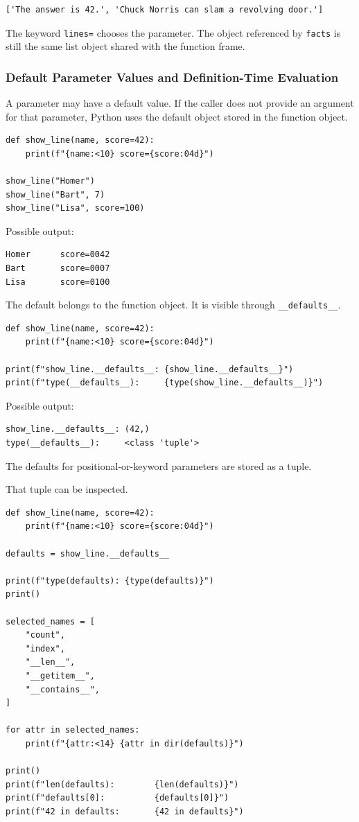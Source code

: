 \begin{verbatim}
['The answer is 42.', 'Chuck Norris can slam a revolving door.']
\end{verbatim}

The keyword \texttt{lines=} chooses the parameter. The object referenced by \texttt{facts} is still the same list object shared with the function frame.

\subsubsection{Default Parameter Values and Definition-Time Evaluation}

A parameter may have a default value. If the caller does not provide an argument for that parameter, Python uses the default object stored in the function object.

\begin{verbatim}
def show_line(name, score=42):
    print(f"{name:<10} score={score:04d}")

show_line("Homer")
show_line("Bart", 7)
show_line("Lisa", score=100)
\end{verbatim}

Possible output:

\begin{verbatim}
Homer      score=0042
Bart       score=0007
Lisa       score=0100
\end{verbatim}

The default belongs to the function object. It is visible through \texttt{\_\_defaults\_\_}.

\begin{verbatim}
def show_line(name, score=42):
    print(f"{name:<10} score={score:04d}")

print(f"show_line.__defaults__: {show_line.__defaults__}")
print(f"type(__defaults__):     {type(show_line.__defaults__)}")
\end{verbatim}

Possible output:

\begin{verbatim}
show_line.__defaults__: (42,)
type(__defaults__):     <class 'tuple'>
\end{verbatim}

The defaults for positional-or-keyword parameters are stored as a tuple.

That tuple can be inspected.

\begin{verbatim}
def show_line(name, score=42):
    print(f"{name:<10} score={score:04d}")

defaults = show_line.__defaults__

print(f"type(defaults): {type(defaults)}")
print()

selected_names = [
    "count",
    "index",
    "__len__",
    "__getitem__",
    "__contains__",
]

for attr in selected_names:
    print(f"{attr:<14} {attr in dir(defaults)}")

print()
print(f"len(defaults):        {len(defaults)}")
print(f"defaults[0]:          {defaults[0]}")
print(f"42 in defaults:       {42 in defaults}")
\end{verbatim}

